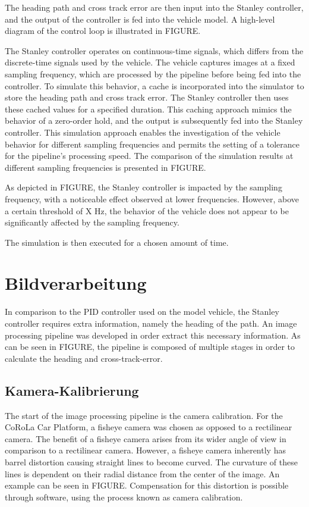 \documentclass[arbeit=studie,oneside,BCOR=12mm]{ArbeitRST}
\begin{document}
The heading path and cross track error are then input into the Stanley
controller, and the output of the controller is fed into the vehicle model. A
high-level diagram of the control loop is illustrated in FIGURE.

The Stanley controller operates on continuous-time signals, which differs from
the discrete-time signals used by the vehicle. The vehicle captures images at a
fixed sampling frequency, which are processed by the pipeline before being fed
into the controller. To simulate this behavior, a cache is incorporated into
the simulator to store the heading path and cross track error. The Stanley
controller then uses these cached values for a specified duration. This caching
approach mimics the behavior of a zero-order hold, and the output is
subsequently fed into the Stanley controller. This simulation approach enables
the investigation of the vehicle behavior for different sampling frequencies
and permits the setting of a tolerance for the pipeline's processing speed. The
comparison of the simulation results at different sampling frequencies is
presented in FIGURE.

As depicted in FIGURE, the Stanley controller is impacted by the sampling
frequency, with a noticeable effect observed at lower frequencies. However,
above a certain threshold of X Hz, the behavior of the vehicle does not appear
to be significantly affected by the sampling frequency.

The simulation is then executed for a chosen amount of time. 

\chapter{Bildverarbeitung} 

In comparison to the PID controller used on the model vehicle, the Stanley
controller requires extra information, namely the heading of the path. An image
processing pipeline was developed in order extract this necessary information.
As can be seen in FIGURE, the pipeline is composed of multiple stages in order
to calculate the heading and cross-track-error. 


\section{Kamera-Kalibrierung} 

The start of the image processing pipeline is the camera calibration. For the
CoRoLa Car Platform, a fisheye camera was chosen as opposed to a rectilinear
camera. The benefit of a fisheye camera arises from its wider angle of view in
comparison to a rectilinear camera. However, a fisheye camera inherently has
barrel distortion causing straight lines to become curved. The curvature of
these lines is dependent on their radial distance from the center of
the image. An example can be seen in FIGURE. Compensation for this distortion
is possible through software, using the process known as camera calibration. 
\end{document}
